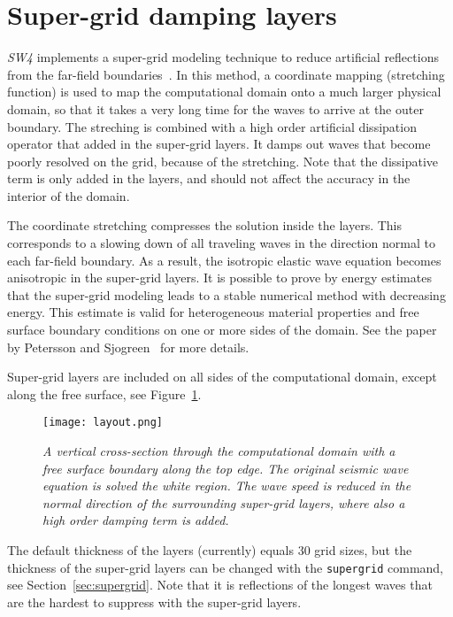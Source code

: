 \documentclass[11pt]{report}
\begin{document}
\section{Super-grid damping layers}

\emph{SW4} implements a super-grid modeling technique to reduce artificial reflections from the
far-field boundaries~\cite{AppCol-09, PetSjo-13}. In this method, a coordinate mapping (stretching
function) is used to map the computational domain onto a much larger physical domain, so that it
takes a very long time for the waves to arrive at the outer boundary. The streching is combined with
a high order artificial dissipation operator that added in the super-grid layers. It damps out waves
that become poorly resolved on the grid, because of the stretching. Note that the dissipative term
is only added in the layers, and should not affect the accuracy in the interior of the domain.

The coordinate stretching compresses the solution inside the layers. This corresponds to a slowing
down of all traveling waves in the direction normal to each far-field boundary. As a result, the
isotropic elastic wave equation becomes anisotropic in the super-grid layers. It is possible to
prove by energy estimates that the super-grid modeling leads to a stable numerical method with
decreasing energy. This estimate is valid for heterogeneous material properties and free surface
boundary conditions on one or more sides of the domain. See the paper by Petersson and
Sjogreen~\cite{PetSjo-13} for more details.

Super-grid layers are included on all sides of the computational domain, except along the
free surface, see Figure~\ref{fig:layout}.
\begin{figure}[th]
\begin{center}
\texttt{[image: layout.png]}
\caption{\em A vertical cross-section through the computational domain with a free surface boundary
  along the top edge. The original seismic wave equation is solved the white region. The wave speed
  is reduced in the normal direction of the surrounding super-grid layers, where also a high order
  damping term is added.}\label{fig:layout}
\end{center}
\end{figure}
The default thickness of the layers (currently) equals 30 grid sizes, but the thickness of the
super-grid layers can be changed with the {\tt supergrid} command, see
Section~\ref{sec:supergrid}. Note that it is reflections of the longest waves that are the hardest
to suppress with the super-grid layers.
\end{document}
